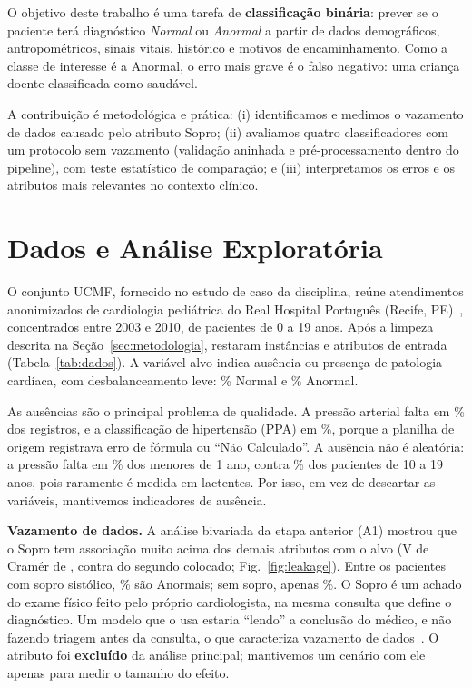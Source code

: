 \documentclass[conference]{IEEEtran}
\begin{document}
O objetivo deste trabalho é uma tarefa de \textbf{classificação binária}: prever se o paciente terá diagnóstico \emph{Normal} ou \emph{Anormal} a partir de dados demográficos, antropométricos, sinais vitais, histórico e motivos de encaminhamento. Como a classe de interesse é a Anormal, o erro mais grave é o falso negativo: uma criança doente classificada como saudável.

A contribuição é metodológica e prática: (i) identificamos e medimos o vazamento de dados causado pelo atributo Sopro; (ii) avaliamos quatro classificadores com um protocolo sem vazamento (validação aninhada e pré-processamento dentro do pipeline), com teste estatístico de comparação; e (iii) interpretamos os erros e os atributos mais relevantes no contexto clínico.

\section{Dados e Análise Exploratória}

O conjunto UCMF, fornecido no estudo de caso da disciplina, reúne atendimentos anonimizados de cardiologia pediátrica do Real Hospital Português (Recife, PE)~\cite{ferreira2013}, concentrados entre 2003 e 2010, de pacientes de 0 a 19 anos. Após a limpeza descrita na Seção~\ref{sec:metodologia}, restaram \nInstancias{} instâncias e \nAtributos{} atributos de entrada (Tabela~\ref{tab:dados}). A variável-alvo indica ausência ou presença de patologia cardíaca, com desbalanceamento leve: \pctNormal\% Normal e \pctAnormal\% Anormal.

\begin{table}[!t]
\caption{Características do conjunto após a limpeza}
\label{tab:dados}
\centering\footnotesize

\end{table}

As ausências são o principal problema de qualidade. A pressão arterial falta em \pctAusentePa\% dos registros, e a classificação de hipertensão (PPA) em \pctAusentePpa\%, porque a planilha de origem registrava erro de fórmula ou ``Não Calculado''. A ausência não é aleatória: a pressão falta em \pctAusentePaLactente\% dos menores de 1 ano, contra \pctAusentePaAdolesc\% dos pacientes de 10 a 19 anos, pois raramente é medida em lactentes. Por isso, em vez de descartar as variáveis, mantivemos indicadores de ausência.

\textbf{Vazamento de dados.} A análise bivariada da etapa anterior (A1) mostrou que o Sopro tem associação muito acima dos demais atributos com o alvo (V de Cramér de \vSopro{}, contra \vMotivoDois{} do segundo colocado; Fig.~\ref{fig:leakage}). Entre os pacientes com sopro sistólico, \soproSistolico\% são Anormais; sem sopro, apenas \soproAusente\%. O Sopro é um achado do exame físico feito pelo próprio cardiologista, na mesma consulta que define o diagnóstico. Um modelo que o usa estaria ``lendo'' a conclusão do médico, e não fazendo triagem antes da consulta, o que caracteriza vazamento de dados~\cite{kaufman2012}. O atributo foi \textbf{excluído} da análise principal; mantivemos um cenário com ele apenas para medir o tamanho do efeito.
\end{document}
